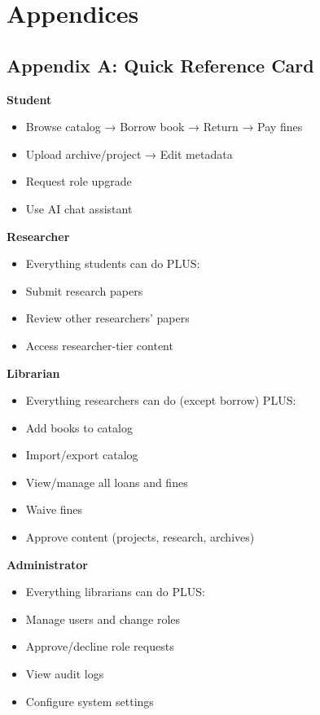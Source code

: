 \documentclass[12pt,a4paper]{article}
\begin{document}
\newpage

\section{Appendices}

\subsection{Appendix A: Quick Reference Card}

\begin{tcolorbox}[colback=blue!5!white,colframe=primarycolor,title=Quick Actions by Role]

\textbf{Student}
\begin{itemize}[leftmargin=*]
    \item Browse catalog → Borrow book → Return → Pay fines
    \item Upload archive/project → Edit metadata
    \item Request role upgrade
    \item Use AI chat assistant
\end{itemize}

\textbf{Researcher}
\begin{itemize}[leftmargin=*]
    \item Everything students can do PLUS:
    \item Submit research papers
    \item Review other researchers' papers
    \item Access researcher-tier content
\end{itemize}

\textbf{Librarian}
\begin{itemize}[leftmargin=*]
    \item Everything researchers can do (except borrow) PLUS:
    \item Add books to catalog
    \item Import/export catalog
    \item View/manage all loans and fines
    \item Waive fines
    \item Approve content (projects, research, archives)
\end{itemize}

\textbf{Administrator}
\begin{itemize}[leftmargin=*]
    \item Everything librarians can do PLUS:
    \item Manage users and change roles
    \item Approve/decline role requests
    \item View audit logs
    \item Configure system settings
\end{itemize}

\end{tcolorbox}
\end{document}
